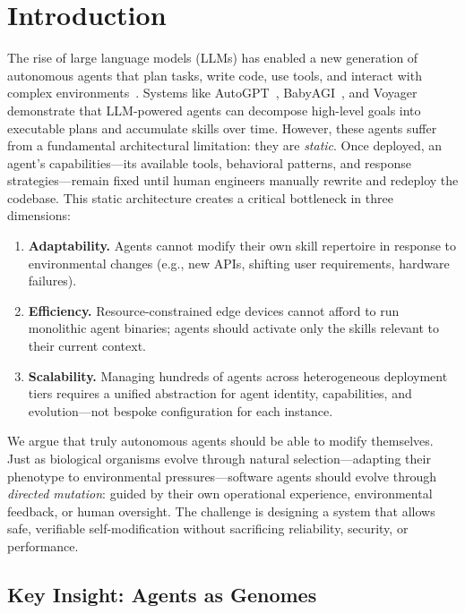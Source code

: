 \documentclass{article}
\begin{document}
\section{Introduction}
\label{sec:introduction}

The rise of large language models (LLMs) has enabled a new generation of autonomous agents that plan tasks, write code, use tools, and interact with complex environments~\cite{wang2023survey, xi2023rise}. Systems like AutoGPT~\cite{auto_gpt}, BabyAGI~\cite{babyagi}, and Voyager~\cite{wang2023voyager} demonstrate that LLM-powered agents can decompose high-level goals into executable plans and accumulate skills over time. However, these agents suffer from a fundamental architectural limitation: they are \textit{static}. Once deployed, an agent's capabilities---its available tools, behavioral patterns, and response strategies---remain fixed until human engineers manually rewrite and redeploy the codebase. This static architecture creates a critical bottleneck in three dimensions:

\begin{enumerate}[leftmargin=*]
    \item \textbf{Adaptability.} Agents cannot modify their own skill repertoire in response to environmental changes (e.g., new APIs, shifting user requirements, hardware failures).
    
    \item \textbf{Efficiency.} Resource-constrained edge devices cannot afford to run monolithic agent binaries; agents should activate only the skills relevant to their current context.
    
    \item \textbf{Scalability.} Managing hundreds of agents across heterogeneous deployment tiers requires a unified abstraction for agent identity, capabilities, and evolution---not bespoke configuration for each instance.
\end{enumerate}

We argue that truly autonomous agents should be able to modify themselves. Just as biological organisms evolve through natural selection---adapting their phenotype to environmental pressures---software agents should evolve through \textit{directed mutation}: guided by their own operational experience, environmental feedback, or human oversight. The challenge is designing a system that allows safe, verifiable self-modification without sacrificing reliability, security, or performance.

\subsection{Key Insight: Agents as Genomes}
\end{document}
